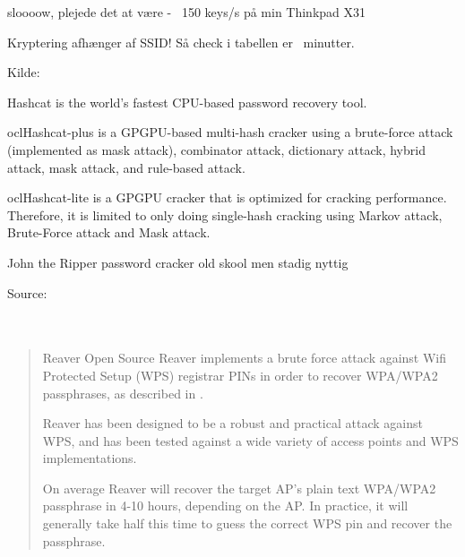 \documentclass[Screen16to9,17pt]{foils}
\begin{document}
\begin{list1}
\item sloooow, plejede det at være -  ~150 keys/s på min Thinkpad X31
\item Kryptering afhænger af SSID! Så check i tabellen er ~minutter.
\item {}
\end{list1}



Kilde: 



\begin{list2}
\item Hashcat is the world's fastest CPU-based password recovery tool.
\item oclHashcat-plus is a GPGPU-based multi-hash cracker using a brute-force attack (implemented as mask attack), combinator attack, dictionary attack, hybrid attack, mask attack, and rule-based attack.
\item oclHashcat-lite is a GPGPU cracker that is optimized for cracking performance. Therefore, it is limited to only doing single-hash cracking using Markov attack, Brute-Force attack and Mask attack.
\item John the Ripper password cracker old skool men stadig nyttig
\end{list2}

Source:\\
\\
\\




\begin{quote}
Reaver Open Source
Reaver implements a brute force attack against Wifi Protected Setup (WPS) registrar PINs in order to recover WPA/WPA2 passphrases, as described in .

Reaver has been designed to be a robust and practical attack against WPS, and has been tested against a wide variety of access points and WPS implementations.

On average Reaver will recover the target AP's plain text WPA/WPA2 passphrase in 4-10 hours, depending on the AP. In practice, it will generally take half this time to guess the correct WPS pin and recover the passphrase.
\end{quote}
\end{document}
